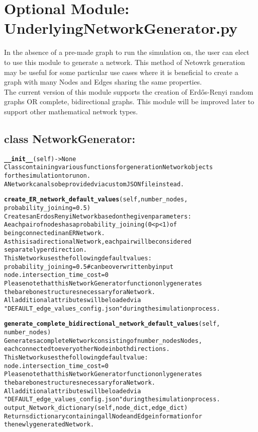 \section{Optional Module:  \\ UnderlyingNetworkGenerator.py}
In the absence of a pre-made graph to run the simulation on, the user can elect to use this module to generate a network.  This method of Netowrk generation may be useful for some particular use cases where it is beneficial to create a graph with many Nodes and Edges sharing the same properties.\\

\noindent The current version of this module supports the creation of Erdős-Renyi random graphs OR complete, bidirectional graphs.  This module will be improved later to support other mathematical network types.

\subsection{class NetworkGenerator:}

\begin{alltt}
\textbf{__init__}(self) -> None
Class containing various functions for generation Network objects 
for the simulation to run on.
A Network can also be provided via custom JSON file instead.

\textbf{create_ER_network_default_values}(self, number_nodes,
probability_joining=0.5)
Creates an Erdos Renyi Network based on the given parameters:
A each pair of nodes has a probability_joining (0 < p < 1) of 
being connected in an ER Network.
As this is a directional Network, each pair will be considered 
separately per direction.
This Network uses the following default values:
    probability_joining = 0.5     # can be overwritten by input
    node.intersection_time_cost = 0
Please note that this NetworkGenerator function only generates 
the barebone structures necessary for a Network. 
All additional attributes will be loaded via
"DEFAULT_edge_values_config.json" during the simulation process.

\textbf{generate_complete_bidirectional_network_default_values}(self,
number_nodes)
Generates a complete Network consisting of number_nodes Nodes, 
each connected to every other Node in both directions.
This Network uses the following default value:
    node.intersection_time_cost = 0
Please note that this NetworkGenerator function only generates 
the barebone structures necessary for a Network. 
All additional attributes will be loaded via
"DEFAULT_edge_values_config.json" during the simulation process.
output_Network_dictionary(self, node_dict, edge_dict)
Returns dictionary containing all Node and Edge information for 
the newly generated Network.

\end{alltt}

